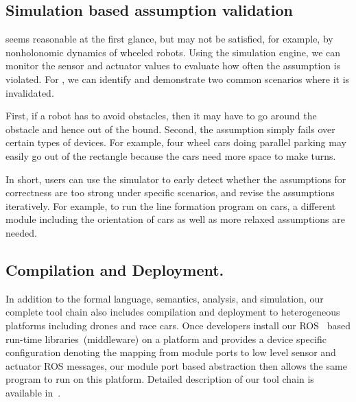 \subsection{Simulation based assumption validation}

 seems reasonable at the first glance, but may not be satisfied, for example, by nonholonomic dynamics of wheeled robots. 
Using the simulation engine, we can monitor the sensor and actuator values to evaluate how often the assumption is violated.
For , we can identify and demonstrate two common scenarios
where it is invalidated.

First, if a robot has to avoid obstacles,
then it may have to go around the obstacle and hence out of the bound.
Second, the assumption simply fails over certain types of devices.
For example, four wheel cars doing parallel parking may easily go out of the rectangle
because the cars need more space to make turns.

In short, users can use the simulator to early detect whether
the assumptions for correctness are too strong under specific scenarios,
and revise the assumptions iteratively.
For example, to run the line formation program on cars,
a different module including the orientation of cars as well as more relaxed assumptions are needed.

\subsection{Compilation and Deployment.}
In addition to the formal language, semantics, analysis, and simulation,
our complete tool chain also includes compilation and deployment to heterogeneous platforms including drones and race cars.
Once developers install our ROS~\cite{ros} based run-time libraries~(middleware) on a platform
and provides a device specific configuration denoting the mapping from \lgname module ports
to low level sensor and actuator ROS messages,
our module port based abstraction then allows the same \lgname program to run on this platform.
Detailed description of our tool chain is available in~\cite{ghosh2019cyphyhouse}.
